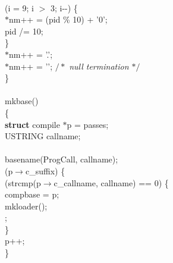 \begin{flushleft}
\mbox{}\\
\hspace*{3\indentation}{\bf for} (i = 9; i $>$ 3; i-{}-) \{\mbox{}\\
\hspace*{6\indentation}$\ast$nm++ = (pid \% 10) + '0';\mbox{}\\
\hspace*{6\indentation}pid /= 10;\mbox{}\\
\hspace*{3\indentation}\}\mbox{}\\
\hspace*{3\indentation}$\ast$nm++ = '.';\mbox{}\\
\hspace*{3\indentation}$\ast$nm++ = '\0'; {$/\ast$\it{} null termination $\ast/$}\mbox{}\\
\}\mbox{}\\
\mbox{}\\
mkbase()\mbox{}\\
\{\mbox{}\\
\hspace*{3\indentation}{\bf register} {\bf struct} compile $\ast$p = passes;\mbox{}\\
\hspace*{3\indentation}USTRING callname;\mbox{}\\
\mbox{}\\
\hspace*{3\indentation}basename(ProgCall, callname);\mbox{}\\
\hspace*{3\indentation}{\bf while} (p$\rightarrow$c\_suffix) \{\mbox{}\\
\hspace*{6\indentation}{\bf if} (strcmp(p$\rightarrow$c\_callname, callname) == 0) \{\mbox{}\\
\hspace*{9\indentation}compbase = p;\mbox{}\\
\hspace*{9\indentation}mkloader();\mbox{}\\
\hspace*{9\indentation}{\bf return};\mbox{}\\
\hspace*{6\indentation}\}\mbox{}\\
\hspace*{6\indentation}p++;\mbox{}\\
\hspace*{3\indentation}\}\mbox{}\\

\end{flushleft}
